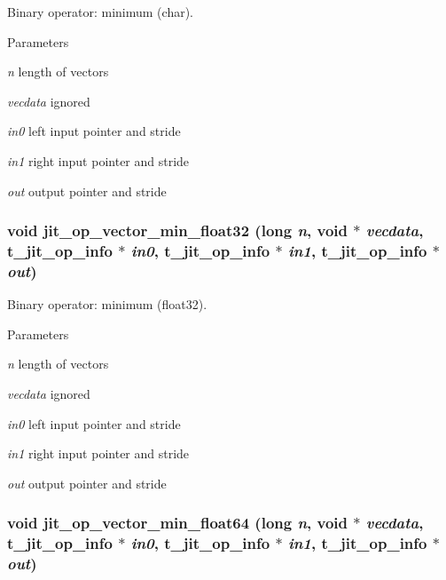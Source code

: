 Binary operator: minimum (char). 
\begin{DoxyParams}{Parameters}
\item[{\em n}]length of vectors \item[{\em vecdata}]ignored \item[{\em in0}]left input pointer and stride \item[{\em in1}]right input pointer and stride \item[{\em out}]output pointer and stride \end{DoxyParams}
\hypertarget{group__opvecmod_ga62f19f6a8c37832e5e7a9bc8586a91c6}{
\subsubsection[{jit\_\-op\_\-vector\_\-min\_\-float32}]{\setlength{\rightskip}{0pt plus 5cm}void jit\_\-op\_\-vector\_\-min\_\-float32 (long {\em n}, \/  void $\ast$ {\em vecdata}, \/  {\bf t\_\-jit\_\-op\_\-info} $\ast$ {\em in0}, \/  {\bf t\_\-jit\_\-op\_\-info} $\ast$ {\em in1}, \/  {\bf t\_\-jit\_\-op\_\-info} $\ast$ {\em out})}}
\label{group__opvecmod_ga62f19f6a8c37832e5e7a9bc8586a91c6}


Binary operator: minimum (float32). 
\begin{DoxyParams}{Parameters}
\item[{\em n}]length of vectors \item[{\em vecdata}]ignored \item[{\em in0}]left input pointer and stride \item[{\em in1}]right input pointer and stride \item[{\em out}]output pointer and stride \end{DoxyParams}
\hypertarget{group__opvecmod_gaecf137738b7cecc8da5507d295cbac11}{
\subsubsection[{jit\_\-op\_\-vector\_\-min\_\-float64}]{\setlength{\rightskip}{0pt plus 5cm}void jit\_\-op\_\-vector\_\-min\_\-float64 (long {\em n}, \/  void $\ast$ {\em vecdata}, \/  {\bf t\_\-jit\_\-op\_\-info} $\ast$ {\em in0}, \/  {\bf t\_\-jit\_\-op\_\-info} $\ast$ {\em in1}, \/  {\bf t\_\-jit\_\-op\_\-info} $\ast$ {\em out})}}
\label{group__opvecmod_gaecf137738b7cecc8da5507d295cbac11}


